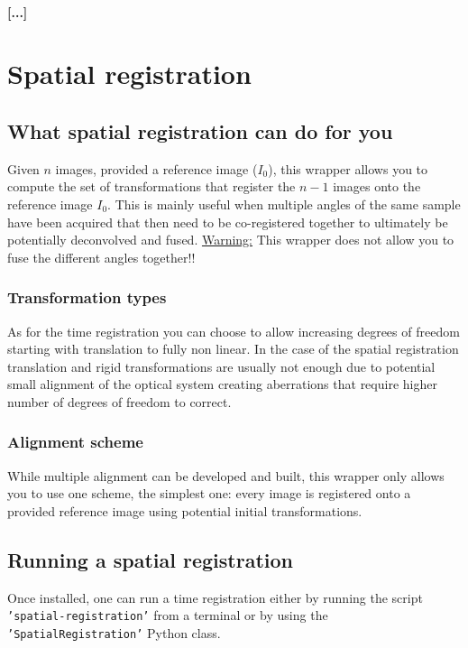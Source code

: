 \documentclass[10pt,a4paper]{book}
\newcommand{\option}[1]{{\texttt{'#1'}}}
\begin{document}
\subsubsection{[...]}
\chapter{Spatial registration}
\section{What spatial registration can do for you}
Given $n$ images, provided a reference image ($I_0$), this wrapper allows you to compute the set of transformations that register the $n-1$ images onto the reference image $I_0$. This is mainly useful when multiple angles of the same sample have been acquired that then need to be co-registered together to ultimately be potentially deconvolved and fused. \underline{Warning:} This wrapper does not allow you to fuse the different angles together!!
\subsection{Transformation types}
As for the time registration you can choose to allow increasing degrees of freedom starting with translation to fully non linear. In the case of the spatial registration translation and rigid transformations are usually not enough due to potential small alignment of the optical system creating aberrations that require higher number of degrees of freedom to correct.
\subsection{Alignment scheme}
While multiple alignment can be developed and built, this wrapper only allows you to use one scheme, the simplest one: every image is registered onto a provided reference image using potential initial transformations.
\section{Running a spatial registration}
Once installed, one can run a time registration either by running the script \option{spatial-registration} from a terminal or by using the \option{SpatialRegistration} Python class.\\
\end{document}
